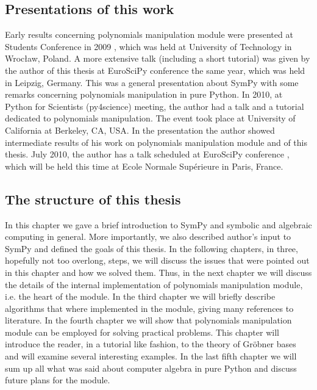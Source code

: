 \subsection{Presentations of this work}

Early results concerning polynomials manipulation module were presented at Students Conference in
2009 \cite{KNS2009}, which was held at University of Technology in Wrocław, Poland. A more extensive
talk (including a short tutorial) was given by the author of this thesis at EuroSciPy conference
\cite{EuroSciPy2009} the same year, which was held in Leipzig, Germany. This was a general presentation
about SymPy with some remarks concerning polynomials manipulation in pure Python. In 2010, at Python
for Scientists (py4science) meeting, the author had a talk and a tutorial \cite{py4science2010} dedicated
to polynomials manipulation. The event took place at University of California at Berkeley, CA, USA. In
the presentation the author showed intermediate results of his work on polynomials manipulation module
and of this thesis. July 2010, the author has a talk scheduled at EuroSciPy conference \cite{EuroSciPy2010},
which will be held this time at Ecole Normale Supérieure in Paris, France.


\subsection{The structure of this thesis}

In this chapter we gave a brief introduction to SymPy and symbolic and algebraic computing in general.
More importantly, we also described author's input to SymPy and defined the goals of this thesis. In
the following chapters, in three, hopefully not too overlong, steps, we will discuss the issues that
were pointed out in this chapter and how we solved them. Thus, in the next chapter we will discuss
the details of the internal implementation of polynomials manipulation module, i.e. the heart of the
module. In the third chapter we will briefly describe algorithms that where implemented in the module,
giving many references to literature. In the fourth chapter we will show that polynomials manipulation
module can be employed for solving practical problems. This chapter will introduce the reader, in a
tutorial like fashion, to the theory of Gröbner bases and will examine several interesting examples.
In the last fifth chapter we will sum up all what was said about computer algebra in pure Python and
discuss future plans for the module.


